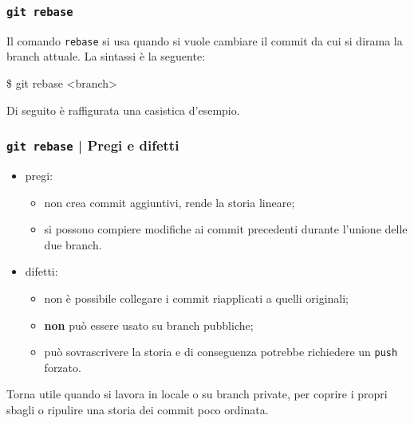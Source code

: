 \documentclass{beamer}
\begin{document}
\begin{frame}
  \frametitle{\texttt{git rebase}}
  Il comando \texttt{rebase} si usa quando si vuole cambiare il commit da cui si
  dirama la branch attuale. La sintassi \`e la seguente:
  \begin{semiverbatim}
  \$ git rebase <branch>
  \end{semiverbatim}
  Di seguito \`e raffigurata una casistica d'esempio.

  \begin{figure}
  \end{figure}
\end{frame}

\begin{frame}
  \frametitle{\texttt{git rebase} | Pregi e difetti}
  \begin{itemize}
    \item pregi: \begin{itemize}
      \item non crea commit aggiuntivi, rende la storia lineare;
      \item si possono compiere modifiche ai commit precedenti durante l'unione
        delle due branch.
    \end{itemize}
    \item difetti: \begin{itemize}
      \item non \`e possibile collegare i commit riapplicati a quelli originali;
      \item \textbf{non} pu\`o essere usato su branch pubbliche;
      \item pu\`o sovrascrivere la storia e di conseguenza potrebbe
        richiedere un \texttt{push} forzato.
    \end{itemize}
  \end{itemize}

  Torna utile quando si lavora in locale o su branch private, per coprire i
  propri sbagli o ripulire una storia dei commit poco ordinata.
\end{frame}
\end{document}
